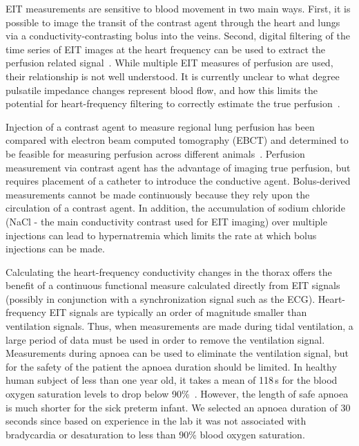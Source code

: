 EIT measurements are sensitive to blood movement in
two main ways. First, it is possible to image the transit of the
contrast agent through the heart and lungs via a conductivity-contrasting
bolus into the veins. Second,
digital filtering of the time series of EIT images at the heart
frequency can be used to extract the perfusion related 
signal~\parencite{leathard_comparison_1994}.
While multiple EIT measures of perfusion are used, their relationship is 
not well understood.
It is currently unclear to what degree pulsatile impedance changes
represent blood flow, and how
this limits the potential for heart-frequency filtering to correctly estimate
the true perfusion~\parencite{nguyen_review_2012}.

Injection of a contrast agent to measure regional lung perfusion has been compared with 
electron beam computed tomography (EBCT) and determined to be feasible 
for measuring perfusion across different animals~\parencite{frerichs_regional_2002}.
Perfusion measurement via contrast agent has the advantage of imaging true perfusion,
but requires placement of a catheter to 
introduce the conductive agent.
Bolus-derived measurements cannot be made continuously because they rely
upon the circulation of a contrast agent. In addition, 
the accumulation of sodium chloride (NaCl - the main conductivity contrast used for EIT imaging)
over multiple injections
can lead to hypernatremia which limits the rate at which bolus
injections can be made.
 
Calculating the heart-frequency conductivity 
changes in the thorax offers the benefit of a continuous functional
measure calculated directly from EIT signals (possibly
in conjunction with a synchronization signal such as the ECG).
Heart-frequency EIT signals are typically an order of magnitude smaller than
ventilation signals. Thus, when measurements are made during
tidal ventilation, a large period of data must be used
in order to remove the ventilation signal. 
Measurements during apnoea can be used to eliminate the ventilation signal,
but for the safety of the patient the apnoea duration should be limited.
In healthy human subject of less than one year old, it 
takes a mean of 118\,s 
for the blood oxygen saturation levels to drop below
90\%~\parencite{fu_study_1996}. However,
the length of safe apnoea is much shorter for the sick preterm infant.
We selected an apnoea duration of 
30\,seconds since based on experience in the lab it was
not associated with bradycardia or desaturation to less than 90\% blood oxygen saturation.

